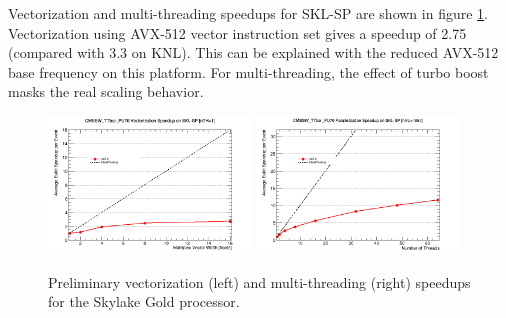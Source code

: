 \documentclass{webofc}
\def\twop{0.48\textwidth}
\def\postfigskip{\vskip-4mm}
\begin{document}
Vectorization and multi-threading speedups for SKL-SP are shown in figure
\ref{fig:vec-th-speedup-skl}. Vectorization using AVX-512 vector instruction
set gives a speedup of 2.75 (compared with 3.3 on KNL). This can be explained
with the reduced AVX-512 base frequency on this platform. For multi-threading,
the effect of turbo boost masks the real scaling behavior.

\begin{figure}[htb]
  \centering
  \includegraphics[width=\twop]{figs/comp/SKL-SP_CMSSW_TTbar_PU70_VU_speedup.png}
  \hfill
  \includegraphics[width=\twop]{figs/comp/SKL-SP_CMSSW_TTbar_PU70_TH_speedup.png}
  \postfigskip

  \caption{Preliminary vectorization (left) and multi-threading (right) speedups 
    for the Skylake Gold processor.}
  \label{fig:vec-th-speedup-skl}
\end{figure}
\end{document}
